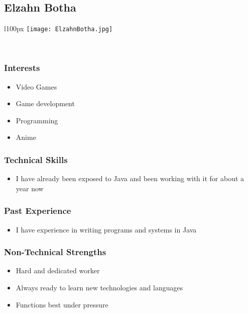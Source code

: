 
\subsection{Elzahn Botha}
\begin{wrapfigure}[6]{l}{100px}
\vspace{10pt}
\texttt{[image: ElzahnBotha.jpg]}
\end{wrapfigure}

\textcolor{white}{.}
\subsubsection{Interests}
\begin{itemize}
	\item{Video Games}
	\item{Game development}
	\item{Programming}
	\item{Anime}
\end{itemize}
\subsubsection{Technical Skills} 
\begin{itemize}
	\item{I have already been exposed to Java and been working with it for about a year now}
\end{itemize}
\subsubsection{Past Experience}
\begin{itemize}
	\item{I have experience in writing programs and systems in Java}
\end{itemize}
\subsubsection{Non-Technical Strengths} 
\begin{itemize}
	\item{Hard and dedicated worker}
	\item{Always ready to learn new technologies and languages}
	\item{Functions best under pressure}
\end{itemize}

